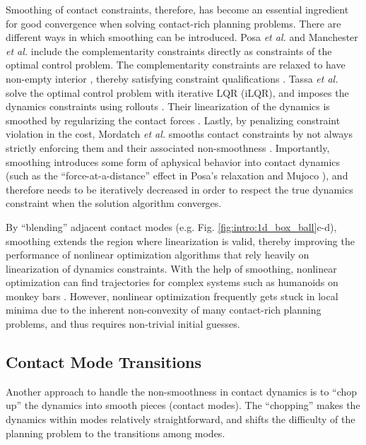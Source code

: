 Smoothing of contact constraints, therefore, has become an essential ingredient for good convergence when solving contact-rich planning problems. There are different ways in which smoothing can be introduced. Posa \textit{et al.}  and Manchester \textit{et al.} include the complementarity constraints directly as constraints of the optimal control problem. The complementarity constraints are relaxed to have non-empty interior \cite{posa2014direct, manchester2020variational}, thereby satisfying constraint qualifications \cite[]{nocedal1999numerical}. Tassa \textit{et al.} solve the optimal control problem with iterative LQR (iLQR), and imposes the dynamics constraints using rollouts \cite{tassa2012synthesis}. Their linearization of the dynamics is smoothed by regularizing the contact forces \cite{todorov2012mujoco}. Lastly, by penalizing constraint violation in the cost, Mordatch \textit{et al.} smooths contact constraints by not always strictly enforcing them and their associated non-smoothness \cite{mordatch2012contact}. Importantly, smoothing introduces some form of aphysical behavior into contact dynamics (such as the ``force-at-a-distance'' effect in Posa's relaxation \cite{posa2014direct} and Mujoco \cite{kolbert2016experimental}), and therefore needs to be iteratively decreased in order to respect the true dynamics constraint when the solution algorithm converges.

By ``blending'' adjacent contact modes (e.g. Fig. \ref{fig:intro:1d_box_ball}c-d), smoothing extends the region where linearization is valid, thereby improving the performance of nonlinear optimization algorithms that rely heavily on linearization of dynamics constraints. With the help of smoothing, nonlinear optimization can find trajectories for complex systems such as humanoids on monkey bars \cite{dai2014whole}. However, nonlinear optimization frequently gets stuck in local minima due to the inherent non-convexity of many contact-rich planning problems, and thus requires non-trivial initial guesses.

\subsection{Contact Mode Transitions}
Another approach to handle the non-smoothness in contact dynamics is to ``chop up'' the dynamics into smooth pieces (contact modes). The ``chopping'' makes the dynamics within modes relatively straightforward, and shifts the difficulty of the planning problem to the transitions among modes. 

